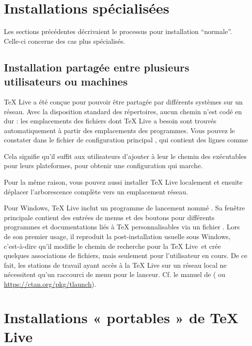 \documentclass[german, english, french]{article}
\renewcommand{\TL}{\TeX{} Live\xspace}%
\begin{document}
\section{Installations spécialisées}

Les sections précédentes décrivaient le processus pour installation
\enquote{normale}. Celle-ci concerne des cas plus spécialisés.

\subsection{Installation partagée entre plusieurs utilisateurs ou machines}
\label{sec:sharedinstall}

\TL a été conçue pour pouvoir être partagée par différents systèmes sur un
réseau.  Avec la disposition standard des répertoires, aucun chemin n'est codé
en dur : les emplacements des fichiers dont \TL a besoin sont trouvés
automatiquement à partir des emplacements des programmes. Vous pouvez le
constater dans le fichier de configuration principal
, %
qui contient des lignes comme
Cela signifie qu'il suffit aux utilisateurs d'ajouter à leur  le
chemin des exécutables pour leurs plateformes, pour obtenir une configuration
qui marche.

Pour la même raison, vous pouvez aussi installer \TL localement et ensuite
déplacer l'arborescence complète vers un emplacement réseau.

Pour Windows, \TL{} inclut un programme de lancement nommé
. Sa fenêtre principale contient des entrées de menus et des
boutons pour différents programmes et documentations liés à \TeX{}
personnalisables via un fichier . Lors de son premier usage, il
reproduit la post-installation usuelle sous Windows, c'est-à-dire qu'il modifie
le chemin de recherche pour la \TL\ et crée quelques associations de fichiers,
mais seulement pour l'utilisateur en cours. De ce fait, les stations de travail
ayant accès à la \TL{} sur un réseau local ne nécessitent qu'un raccourci de
menu pour le lanceur. Cf. le manuel de  ( ou
\url{https://ctan.org/pkg/tlaunch}).

\section{Installations « portables » de \protect\TL}
\label{sec:portable-tl}
\end{document}
